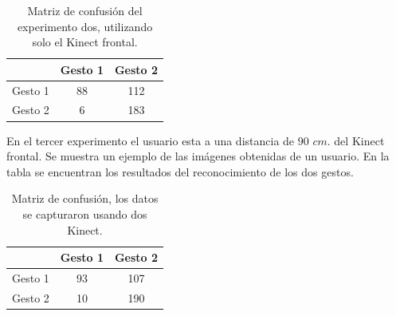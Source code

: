 \begin{table}[h!] 
\begin{center}
\begin{tabular}{ r || c | c |} 
 
        & Gesto 1 & Gesto 2 \\ \hline \hline  
Gesto 1 & 88     &  112     \\ \hline  
Gesto 2 & 6     & 183     \\   

\end{tabular}
\end{center} 
\caption{Matriz de confusión del experimento dos, utilizando solo el Kinect frontal.} 
\end{table}


En el tercer experimento el usuario esta a una distancia de $90$ $cm.$ del Kinect frontal. Se muestra un ejemplo de las imágenes obtenidas de un usuario. En la tabla se encuentran los resultados del reconocimiento de los dos gestos.    


\begin{table}[h!] 
\begin{center}
\begin{tabular}{ r || c | c |} 
 
        & Gesto 1 & Gesto 2 \\ \hline \hline  
Gesto 1 &  93    & 107      \\ \hline  
Gesto 2 &  10    & 190     \\   

\end{tabular}
\end{center} 
\caption{Matriz de confusión, los datos se capturaron usando dos Kinect.}
\end{table}

